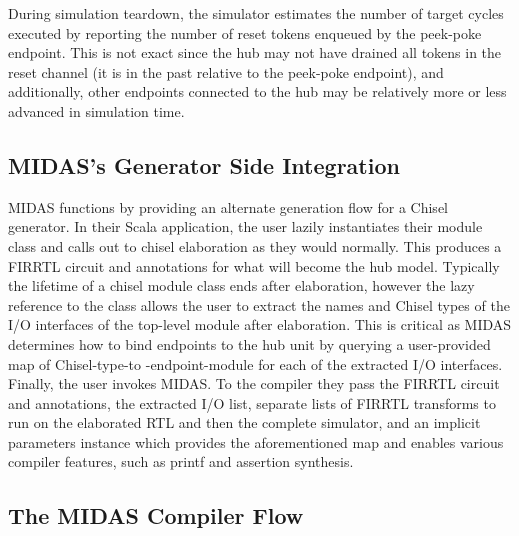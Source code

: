 During simulation teardown, the simulator estimates the number of target cycles executed by
reporting the number of reset tokens enqueued by the peek-poke endpoint. This is not exact since
the hub may not have drained all tokens in the reset channel (it is in the
past relative to the peek-poke endpoint), and additionally, other endpoints
connected to the hub may be relatively more or less advanced in simulation
time.

\subsection{MIDAS's Generator Side Integration}

MIDAS functions by providing an alternate generation flow for a Chisel
generator.  In their Scala application, the user lazily instantiates their
module class and calls out to chisel elaboration as they would normally.
This produces a FIRRTL circuit and annotations for what will become the hub
model.  Typically the lifetime of a chisel module class ends after
elaboration, however the lazy reference to the class allows the user to
extract the names and Chisel types of the I/O interfaces of the top-level
module after elaboration. This is critical as MIDAS determines how to bind
endpoints to the hub unit by querying a user-provided map of Chisel-type-to
-endpoint-module for each of the extracted I/O interfaces. Finally, the user
invokes MIDAS. To the compiler they pass the FIRRTL circuit and annotations, the
extracted I/O list, separate lists of FIRRTL transforms to run on the
elaborated RTL and then the complete simulator, and an implicit parameters
instance which provides the aforementioned map and enables various compiler features,
such as printf and assertion synthesis.

\subsection{The MIDAS Compiler Flow}

